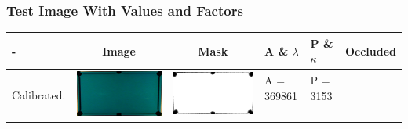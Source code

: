 \subsubsection{Test Image With Values and Factors}
\begin{table}[H]
\begin{tabular}{|l|c|c|l|l|c|}

\hline - & Image & Mask & A \& $\lambda$ & P \& $\kappa$ & Occluded \\ 
\hline

\multirow{4}{*}{Calibrated.} & \multirow{4}{*}{\includegraphics[scale=0.08]{../images/1/calibimg.png}} & \multirow{4}{*}{\includegraphics[scale=0.08]{../images/1/calibmask.png}} & A = 369861 & P = 3153  & \multirow{4}{*}{}\\  
& & & & & \\
&&&&&\\
&&&&&\\
\hline


\end{tabular}
\end{table}
